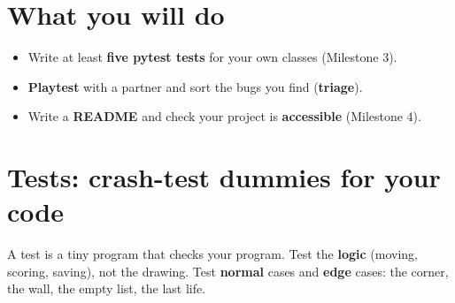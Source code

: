 
\section{What you will do}
\begin{itemize}[itemsep=1pt]
  \item Write at least \textbf{five pytest tests} for your own classes (Milestone 3).
  \item \textbf{Playtest} with a partner and sort the bugs you find (\textbf{triage}).
  \item Write a \textbf{README} and check your project is \textbf{accessible} (Milestone 4).
\end{itemize}

\section{Tests: crash-test dummies for your code}
A test is a tiny program that checks your program. Test the \textbf{logic} (moving, scoring, saving), not the drawing. Test \textbf{normal} cases and \textbf{edge} cases: the corner, the wall, the empty list, the last life.

